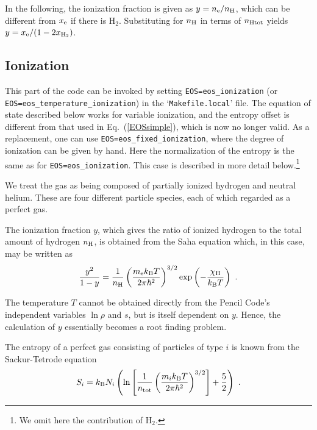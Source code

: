 \documentclass[\mydriver,12pt,twoside,notitlepage,a4paper]{article}
\makeatletter
\newcommand{\code}[1]{\texttt{#1}}
\newcommand{\file}[2][]{%
  \def\index@{#1}%
  `\texttt{#2}'%
  \ifx\index@\@empty\index[file]{#2@\texttt{#2}}%
  \else\index[file]{#1@\texttt{#1}}%
  \fi%
}
\makeatother
\begin{document}
In the following, the ionization fraction is given as $y=n_{\rm e}/n_{\rm H}$,
which can be different from $x_{\rm e}$ if there is H$_2$.
Substituting for $n_{\rm H}$ in terms of $n_{\rm Htot}$ yields
$y=x_{\rm e}/(1-2x_{\rm H_2})$.


\subsection{Ionization}
\label{S-ionization}

This part of the code can be invoked by setting \code{EOS=eos_ionization}
(or \code{EOS=eos_temperature_ionization}) in the \file{Makefile.local} file.
The equation of state described below works for variable ionization, and the
entropy offset is different from that used in Eq.~(\ref{EOSsimple}), which
is now no longer valid.  As a replacement, one can use
\code{EOS=eos_fixed_ionization}, where the degree of ionization can be given
by hand.  Here the normalization of the entropy is the same as for
\code{EOS=eos_ionization}.  This case is described in more detail
below.\footnote{We omit here the contribution of H$_2$.}

We treat the gas as being composed of partially ionized hydrogen and neutral
helium. These are four different particle species, each of which regarded as
a perfect gas.

The ionization fraction $y$, which gives the ratio of ionized hydrogen to the
total amount of hydrogen $n_{\rm H}$, is obtained from the Saha equation
which, in this case, may be written as
\begin{equation}
\frac{y^2}{1-y}=\frac{1}{n_{\rm H}}
\left(\frac{m_{\rm e}k_{\rm B}T}{2\pi\hbar^2}\right)^{3/2}
\exp\left(-\frac{\chi_{\rm H}}{k_{\rm B}T}\right)\ .
\end{equation}

The temperature $T$ cannot be obtained directly from the {\sc Pencil Code}'s
independent variables $\ln\rho$ and $s$, but is itself dependent on $y$.
Hence, the calculation of $y$ essentially becomes a root finding problem.

The entropy of a perfect gas consisting of particles of type $i$ is known from
the Sackur-Tetrode equation
\begin{equation}
S_i=k_{\rm B}N_i\left(\ln\left[\frac{1}{n_{\rm tot}}
                               \left(\frac{m_ik_{\rm B}T}
                                     {2\pi\hbar^2}\right)^{3/2}\right]
                      +\frac{5}{2}\right)\ .
\end{equation}
\end{document}
